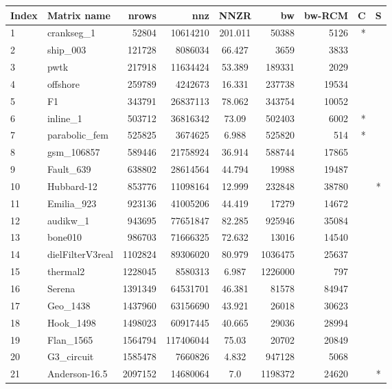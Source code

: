 \begin{tabular}{|l|l|r|r|S[round-mode=places,round-precision=2]|r|r|r|c|}
\toprule
{Index} & {Matrix name} &  {\acrshort{nrows}} & {\acrshort{nnz}} & {\acrshort{NNZR}}  & {bw} & {bw-RCM} & {C} & {S}  \\
\midrule
{1}& {crankseg\_1}	& 52804	& 10614210	& 201.011	& 50388	& 5126	& {*} &	\\
{2}& {ship\_003}	& 121728	& 8086034	& 66.427	& 3659	& 3833	& {} &	\\
{3}& {pwtk}	& 217918	& 11634424	& 53.389	& 189331	& 2029	& {} &	\\
{4}& {offshore}	& 259789	& 4242673	& 16.331	& 237738	& 19534	& {} &	\\
{5}& {F1}	& 343791	& 26837113	& 78.062	& 343754	& 10052	& {} &	\\
{6}& {inline\_1}	& 503712	& 36816342	& 73.09	& 502403	& 6002	& {*} &	\\
{7}& {parabolic\_fem}	& 525825	& 3674625	& 6.988	& 525820	& 514	& {*} &	\\
{8}& {gsm\_106857}	& 589446	& 21758924	& 36.914	& 588744	& 17865	& {} &	\\
{9}& {Fault\_639}	& 638802	& 28614564	& 44.794	& 19988	& 19487	& {} &	\\
{10}& {Hubbard-12}	& 853776	& 11098164	& 12.999	& 232848	& 38780	& {} &	{*}\\
{11}& {Emilia\_923}	& 923136	& 41005206	& 44.419	& 17279	& 14672	& {} &	\\
{12}& {audikw\_1}	& 943695	& 77651847	& 82.285	& 925946	& 35084	& {} &	\\
{13}& {bone010}	& 986703	& 71666325	& 72.632	& 13016	& 14540	& {} &	\\
{14}& {dielFilterV3real}	& 1102824	& 89306020	& 80.979	& 1036475	& 25637	& {} &	\\
{15}& {thermal2}	& 1228045	& 8580313	& 6.987	& 1226000	& 797	& {} &	\\
{16}& {Serena}	& 1391349	& 64531701	& 46.381	& 81578	& 84947	& {} &	\\
{17}& {Geo\_1438}	& 1437960	& 63156690	& 43.921	& 26018	& 30623	& {} &	\\
{18}& {Hook\_1498}	& 1498023	& 60917445	& 40.665	& 29036	& 28994	& {} &	\\
{19}& {Flan\_1565}	& 1564794	& 117406044	& 75.03	& 20702	& 20849	& {} &	\\
{20}& {G3\_circuit}	& 1585478	& 7660826	& 4.832	& 947128	& 5068	& {} &	\\
{21}& {Anderson-16.5}	& 2097152	& 14680064	& 7.0	& 1198372	& 24620	& {} & {*}	\\

\end{tabular}
